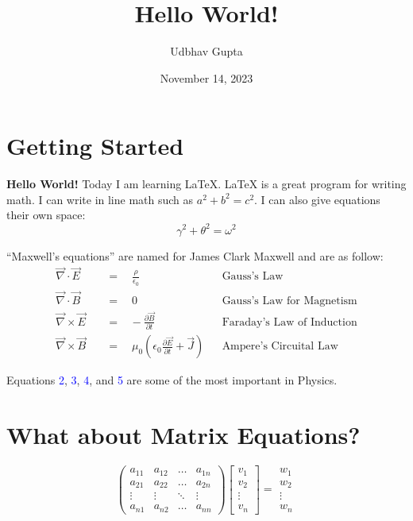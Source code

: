 \documentclass{article}
\title{Hello World!}  %
\author{Udbhav Gupta}  %
\date{November 14, 2023}  %
\begin{document}
    \maketitle
    \thispagestyle{empty}
    \section{Getting Started}
    \textbf{Hello World!} Today I am learning \LaTeX. \LaTeX{} is a great program for writing math. I can write in line math such as $a^2+b^2=c^2$. I can also give equations their own space: 
    \begin{equation} 
    \gamma^2+\theta^2=\omega^2
    \end{equation}

    ``Maxwell's equations'' are named for James Clark Maxwell and are as follow:
    \begin{align}             
    \vec{\nabla} \cdot \vec{E} \quad &=\quad\frac{\rho}{\epsilon_0} &&\text{Gauss's Law} \label{eq:GL}\\      
    \vec{\nabla} \cdot \vec{B} \quad &=\quad 0 &&\text{Gauss's Law for Magnetism} \label{eq:GLM}\\
    \vec{\nabla} \times \vec{E} \quad &=\hspace{10pt}-\frac{\partial{\vec{B}}}{\partial{t}} &&\text{Faraday's Law of Induction} \label{eq:FL}\\ 
    \vec{\nabla} \times \vec{B} \quad &=\quad \mu_0\left( \epsilon_0\frac{\partial{\vec{E}}}{\partial{t}}+\vec{J}\right) &&\text{Ampere's Circuital Law} \label{eq:ACL}
    \end{align}

Equations \textcolor{blue}{2}, \textcolor{blue}{3}, \textcolor{blue}{4}, and \textcolor{blue}{5} are some of the most important in Physics.
\section{What about Matrix Equations?}
\begin{equation*}
\begin{pmatrix}
a_{11}&a_{12}&\dots&a_{1n}\\
a_{21}&a_{22}&\dots&a_{2n}\\
\vdots&\vdots&\ddots&\vdots\\
a_{n1}&a_{n2}&\dots&a_{nn}
\end{pmatrix}
\begin{bmatrix}
v_{1}\\
v_{2}\\
\vdots\\
v_{n}
\end{bmatrix}
=
\begin{matrix}
w_{1}\\
w_{2}\\
\vdots\\
w_{n}


\end{matrix}
\end{equation*}
\end{document}
